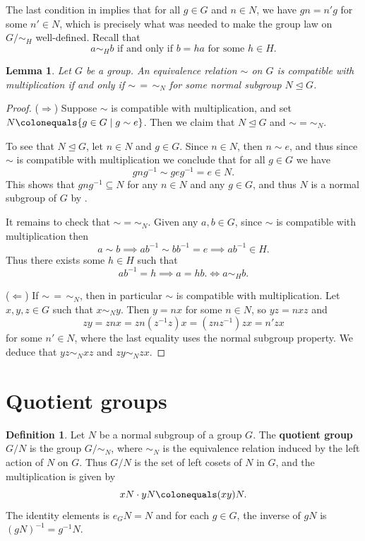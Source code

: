 \documentclass[12pt]{report}
\newtheorem{lemma}[theorem]{Lemma}
\numberwithin{equation}{section}
\numberwithin{theorem}{chapter}
\theoremstyle{definition}
\newtheorem{definition}[theorem]{Definition}
\newtheorem*{basic properties}{Basic Properties}
\newtheorem*{Important Remark}{Important Remark}
\newcommand{\df}[1]{{\bf #1}\index{#1}}
\def\norm{\mathrel{\unlhd}}
\begin{document}
The last condition in  implies that for all $g \in G$ and $n \in N$, we have $gn = n'g$ for some $n' \in N$, which is precisely what was needed to make the group law on $G/\sim_H$ well-defined. Recall that
$$a \sim_H b \textrm{ if and only if } b = ha \text{ for some } h \in H.$$ 



\begin{lemma} 
Let $G$ be a group. An equivalence relation $\sim$ on $G$ is compatible with multiplication if and only if $\sim \,=  \,\sim_N$ for some normal subgroup $N \norm G$.
\end{lemma}

\begin{proof}
($\Rightarrow$) Suppose $\sim$ is compatible with multiplication, and set $N \colonequals \{g \in G \mid g \sim e\}$. Then we claim that $N\norm G$ and $\sim=\sim_N$.

To see that $N\norm G$, let $n\in N$ and $g\in G$. Since $n\in N$, then $n \sim e$, and thus since $\sim$ is compatible with multiplication we conclude that for all $g \in G$ we have
$$gng^{-1}\sim geg^{-1} = e \in N.$$ 
This shows that $gng^{-1} \subseteq N$ for any $n \in N$ and any $g\in G$, and thus $N$ is a normal subgroup of $G$ by .

It remains to check that $\sim=\sim_N$. Given any $a, b \in G$, since $\sim$ is compatible with multiplication then
$$a \sim b \implies ab^{-1} \sim bb^{-1} = e \implies ab^{-1} \in H.$$
Thus there exists some $h \in H$ such that
$$ab^{-1} = h \implies a = hb. \iff a \sim_H b.$$

($\Leftarrow$) If $\sim \,=  \,\sim_N$, then in particular $\sim$ is compatible with multiplication. Let $x,y,z\in G$ such that $x\sim_N y$. Then $y=nx$ for some $n\in N$, so $yz=nxz$ and $$zy=znx=zn(z^{-1}z)x=(znz^{-1})zx=n'zx$$ 
 for some $n'\in N$, where the last equality uses the normal subgroup property. We deduce that $yz\sim_N xz$ and $zy\sim_N zx$.
\end{proof}


\section{Quotient groups}


\begin{definition}\label{$G/N$}
Let $N$ be a normal subgroup of a group $G$. The \df{quotient group} $G/N$ is the group $G/\sim_N$, where $\sim_N$ is the equivalence relation induced by the left action of $N$ on $G$. Thus $G/N$ is the set of left cosets of $N$ in $G$, and the multiplication is given by 
$$xN\cdot yN \colonequals (xy)N.$$ 
The identity elements is $e_GN = N$ and for each $g \in G$, the inverse of $gN$ is $(gN)^{-1} = g^{-1}N$.
\end{definition}
\end{document}
